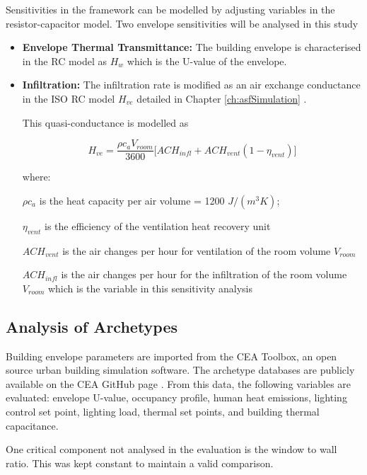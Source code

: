 Sensitivities in the framework can be modelled by adjusting variables in the resistor-capacitor model. Two envelope sensitivities will be analysed in this study

\begin{itemize}

\item \textbf{Envelope Thermal Transmittance:} The building envelope is characterised in the RC model as $H_w$ which is the U-value of the envelope. 
\item \textbf{Infiltration:} The infiltration rate is modified as an air exchange conductance in the ISO RC model $H_{ve}$ detailed in Chapter \ref{ch:asfSimulation} \cite{de2008iso,jayathissa2017AE}.

This quasi-conductance is modelled as

\begin{equation} 
\label{eq:vent}
      H_{ve}= \frac{\rho c_a V_{room}}{3600}\Big[ ACH_{infl} + ACH_{vent}(1-\eta_{vent}) \Big]
\end{equation}

where: 

$\rho c_a$ is the heat capacity per air volume = 1200 $J/(m^3 K)$;

$\eta_{vent}$ is the efficiency of the ventilation heat recovery unit

$ACH_{vent}$ is the air changes per hour for ventilation of the room volume $V_{room}$

$ACH_{infl}$ is the air changes per hour for the infiltration of the room volume $V_{room}$ which is the variable in this sensitivity analysis

\end{itemize}


\subsection{Analysis of Archetypes}

Building envelope parameters are imported from the CEA Toolbox, an open source urban building simulation software. The archetype databases are publicly available on the CEA GitHub page \cite{CEAArchetypes,CEAToolbox}. From this data, the following variables are evaluated: envelope U-value, occupancy profile, human heat emissions, lighting control set point, lighting load, thermal set points, and building thermal capacitance.

One critical component not analysed in the evaluation is the window to wall ratio. This was kept constant to maintain a valid comparison.




